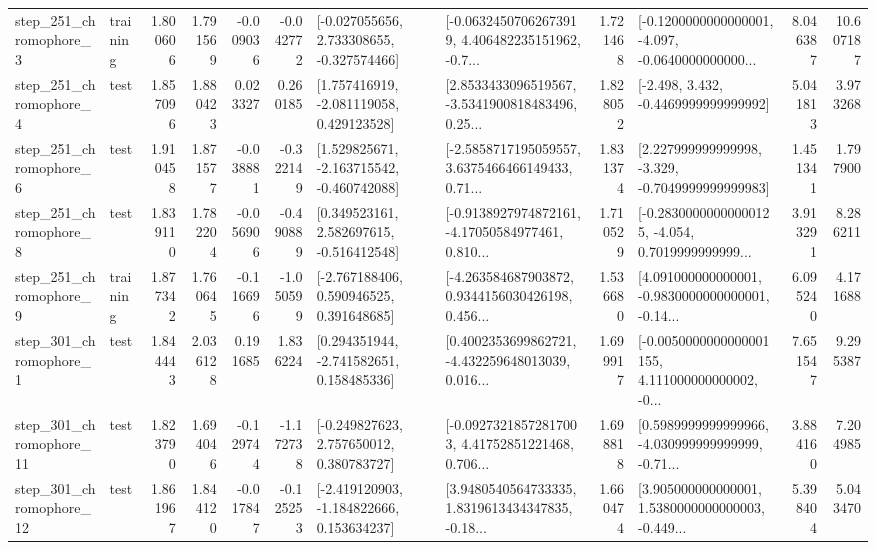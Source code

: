 \begin{tabular}{llrrrrllrlrr}
   step\_251\_chromophore\_3 &  training &      1.800606 &    1.791569 &     -0.009036 & -0.042772 &   [-0.027055656, 2.733308655, -0.327574466] &  [-0.06324507062673919, 4.406482235151962, -0.7... &       1.721468 &  [-0.1200000000000001, -4.097, -0.0640000000000... &            8.046387 &         10.607187 \\
   step\_251\_chromophore\_4 &      test &      1.857096 &    1.880423 &      0.023327 &  0.260185 &    [1.757416919, -2.081119058, 0.429123528] &  [2.8533433096519567, -3.5341900818483496, 0.25... &       1.828052 &               [-2.498, 3.432, -0.4469999999999992] &            5.041813 &          3.973268 \\
   step\_251\_chromophore\_6 &      test &      1.910458 &    1.871577 &     -0.038881 & -0.322149 &   [1.529825671, -2.163715542, -0.460742088] &  [-2.5858717195059557, 3.6375466466149433, 0.71... &       1.831374 &   [2.227999999999998, -3.329, -0.7049999999999983] &            1.451341 &          1.797900 \\
   step\_251\_chromophore\_8 &      test &      1.839110 &    1.782204 &     -0.056906 & -0.490889 &    [0.349523161, 2.582697615, -0.516412548] &  [-0.9138927974872161, -4.17050584977461, 0.810... &       1.710529 &  [-0.28300000000000125, -4.054, 0.7019999999999... &            3.913291 &          8.286211 \\
   step\_251\_chromophore\_9 &  training &      1.877342 &    1.760645 &     -0.116696 & -1.050599 &    [-2.767188406, 0.590946525, 0.391648685] &  [-4.263584687903872, 0.9344156030426198, 0.456... &       1.536680 &  [4.091000000000001, -0.9830000000000001, -0.14... &            6.095240 &          4.171688 \\
   step\_301\_chromophore\_1 &      test &      1.844443 &    2.036128 &      0.191685 &  1.836224 &    [0.294351944, -2.741582651, 0.158485336] &  [0.4002353699862721, -4.432259648013039, 0.016... &       1.699917 &  [-0.0050000000000001155, 4.111000000000002, -0... &            7.651547 &          9.295387 \\
  step\_301\_chromophore\_11 &      test &      1.823790 &    1.694046 &     -0.129744 & -1.172738 &    [-0.249827623, 2.757650012, 0.380783727] &  [-0.09273218572817003, 4.41752851221468, 0.706... &       1.698818 &  [0.5989999999999966, -4.030999999999999, -0.71... &            3.884160 &          7.204985 \\
  step\_301\_chromophore\_12 &      test &      1.861967 &    1.844120 &     -0.017847 & -0.125253 &   [-2.419120903, -1.184822666, 0.153634237] &  [3.9480540564733335, 1.8319613434347835, -0.18... &       1.660474 &  [3.905000000000001, 1.5380000000000003, -0.449... &            5.398404 &          5.043470 \\

\end{tabular}
